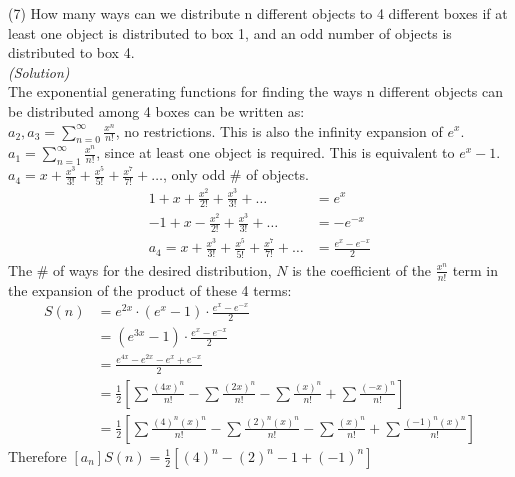 (7) How many ways can we distribute n different objects to 4 different boxes if
    at least one object is distributed to box 1, and an odd number of objects
    is distributed to box 4.\\

    \textit{(Solution)}\\

    The exponential generating functions for finding 
    the ways n different objects can be distributed among 4 boxes
    can be written as:\\

    $a_2,a_3 = \sum_{n=0}^{\infty}{\frac{x^n}{n!}}$, 
    no restrictions. This is also the infinity expansion of
    $e^x$.\\

    $a_1 = \sum_{n=1}^{\infty}{\frac{x^n}{n!}}$, 
    since at least one object is required.
    This is equivalent to $e^x-1$.\\

    $a_4 = x + \frac{x^3}{3!} + \frac{x^5}{5!} + \frac{x^7}{7!} + \dots$, 
    only odd \# of objects.
    \begin{align*}
        1 + x + \frac{x^2}{2!} + \frac{x^3}{3!} + \dots &= e^x\\
        -1 + x - \frac{x^2}{2!} + \frac{x^3}{3!} + \dots &= -e^{-x}\\
        a_4 = x + \frac{x^3}{3!} + \frac{x^5}{5!} + \frac{x^7}{7!} + \dots
        &= \frac{e^x-e^{-x}}{2}
    \end{align*}
    The \# of ways for the desired distribution, $N$
    is the coefficient of the $\frac{x^n}{n!}$ term in the expansion
    of the product of these 4 terms:\\
    \begin{align*}
        S(n) &= e^{2x} \cdot (e^x-1) \cdot \frac{e^x-e^{-x}}{2}\\
        &= (e^{3x}-1) \cdot \frac{e^x-e^{-x}}{2}\\
        &= \frac{e^{4x}-e^{2x} - e^x + e^{-x}}{2}\\
        &= \frac{1}{2}\left[
            \sum{\frac{(4x)^n}{n!}}
            - \sum{\frac{(2x)^n}{n!}}
            - \sum{\frac{(x)^n}{n!}}
            + \sum{\frac{(-x)^n}{n!}}
            \right]\\
        &= \frac{1}{2}\left[
            \sum{\frac{(4)^n(x)^n}{n!}}
            - \sum{\frac{(2)^n(x)^n}{n!}}
            - \sum{\frac{(x)^n}{n!}}
            + \sum{\frac{(-1)^n(x)^n}{n!}}
            \right]
    \end{align*}
    Therefore $[a_n]S(n) = \boxed{\frac{1}{2}\left[
        (4)^n
        - (2)^n
        - 1
        + (-1)^n
        \right]}$

    